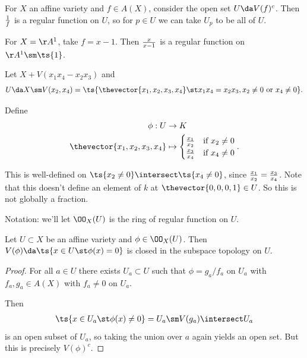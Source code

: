 \begin{example}

For \(X\) an affine variety and \(f\in A(X)\), consider the open set
\(U\da V(f)^c\). Then \({1\over f}\) is a regular function on \(U\), so
for \(p\in U\) we can take \(U_p\) to be all of \(U\).

\end{example}

\begin{example}

For \(X = \AA^1\), take \(f=x-1\). Then \({x\over x-1}\) is a regular
function on \(\AA^1 \sm\ts{1}\).

\end{example}

\begin{example}

Let \(X + V(x_1 x_4 - x_2 x_3)\) and
\begin{align*}  
U \da X\sm V(x_2, x_4) = \ts{\thevector{x_1, x_2, x_3, x_4} \st x_1 x_4 = x_2 x_3, x_2\neq 0 \text{ or } x_4\neq 0 }
.\end{align*}

Define
\begin{align*}  
\phi: U &\to K \\
\thevector{x_1, x_2, x_3, x_4} &\mapsto
\begin{cases}
{x_1\over x_2} & \text{if } x_2 \neq 0 \\
{x_3\over x_4} & \text{if } x_4 \neq 0
\end{cases}
.\end{align*}

This is well-defined on \(\ts{x_2\neq 0} \intersect \ts{x_4 \neq 0}\),
since \({x_1\over x_2} = {x_3 \over x_4}\). Note that this doesn't
define an element of \(k\) at \(\thevector{0,0,0,1}\in U\). So this is
not globally a fraction.

\end{example}

Notation: we'll let \(\OO_X(U)\) is the ring of regular function on
\(U\).

\begin{proposition}[?]

Let \(U\subset X\) be an affine variety and \(\phi \in \OO_X(U)\). Then
\(V(\phi) \da \ts{x\in U \st \phi(x) = 0}\) is closed in the subspace
topology on \(U\).

\end{proposition}

\begin{proof}

For all \(a\in U\) there exists \(U_a\subset U\) such that
\(\phi = g_a/f_a\) on \(U_a\) with \(f_a, g_a \in A(X)\) with
\(f_a \neq 0\) on \(U_a\).

Then
\begin{align*}  
\ts{x\in U_a \st \phi(x) \neq 0} = U_a \sm V(g_a)\intersect U_a
\end{align*} is an open subset of \(U_a\), so taking the union over
\(a\) again yields an open set. But this is precisely \(V(\phi)^c\).

\end{proof}


